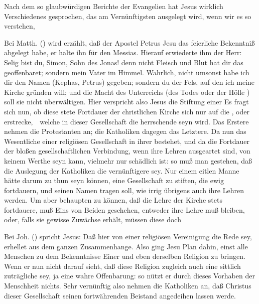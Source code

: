 Nach dem so glaubwürdigen Berichte der Evangelien hat Jesus wirklich Verschiedenes gesprochen, das am Vernünftigsten ausgelegt wird, wenn wir es so verstehen, 
\begin{aufza}
\item Bei Matth. () wird erzählt, daß der Apostel Petrus Jesu das feierliche Bekenntniß abgelegt habe, er halte ihn für den Messias. Hierauf erwiederte ihm der Herr: Selig bist du, Simon, Sohn des Jonas! denn nicht Fleisch und Blut hat dir das geoffenbaret; sondern mein Vater im Himmel. Wahrlich, nicht umsonst habe ich dir den Namen  (Kephas, Petrus) gegeben; sondern du  der Fels, auf den ich meine Kirche gründen will; und die Macht des Unterreichs (des Todes oder der Hölle%
) soll sie nicht überwältigen. Hier verspricht also Jesus die Stiftung einer  Es fragt sich nun, ob diese stete Fortdauer der christlichen Kirche sich nur auf die , oder  erstrecke,~\ welche in dieser Gesellschaft die herrschende seyn wird. Das Erstere nehmen die Protestanten an; die Katholiken dagegen das Letztere. Da nun das Wesentliche einer religiösen Gesellschaft in ihrer  bestehet, und da die Fortdauer der bloßen gesellschaftlichen Verbindung, wenn ihre Lehren ausgeartet sind, von keinem Werthe seyn kann, vielmehr nur schädlich ist: so muß man gestehen, daß die Auslegung der Katholiken die vernünftigere sey. Nur einem eitlen Manne hätte darum zu thun seyn können, eine Gesellschaft zu stiften, die ewig fortdauern, und seinen Namen tragen soll, wie irrig übrigens auch ihre Lehren werden. Um aber behaupten zu können, daß die Lehre der Kirche stets fortdauere, muß Eins von Beiden geschehen, entweder ihre Lehre muß  bleiben, oder, falls sie gewisse Zuwächse erhält, müssen diese doch 
\item Bei Joh. () spricht Jesus:  Daß hier von einer religiösen Vereinigung die Rede sey, erhellet aus dem ganzen Zusammenhange. Also ging Jesu Plan dahin, einst alle Menschen zu dem Bekenntnisse Einer und eben derselben Religion zu bringen. Wenn er nun nicht darauf sieht, daß diese Religion zugleich auch eine sittlich zuträgliche sey, ja eine wahre Offenbarung: so nützt er durch dieses Vorhaben der Menschheit nichts. Sehr vernünftig also nehmen die Katholiken an, daß Christus dieser Gesellschaft seinen fortwährenden Beistand angedeihen lassen werde.

\end{aufza}
